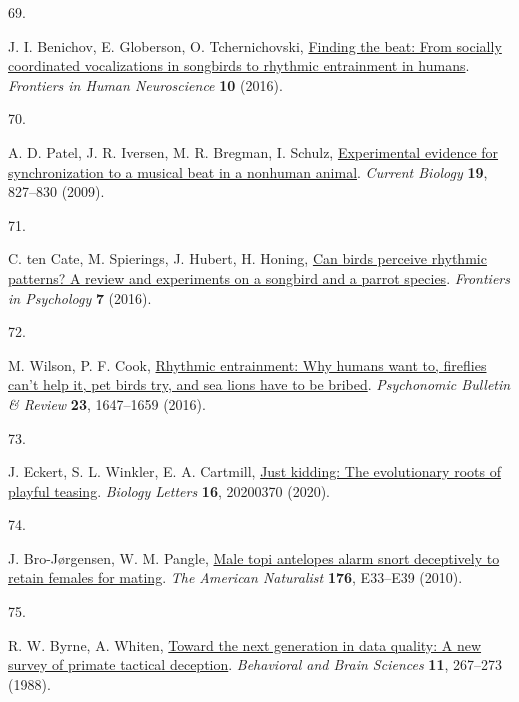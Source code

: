 \documentclass[
  man,floatsintext]{apa6}
\newlength{\cslhangindent}
\newlength{\csllabelwidth}
\newlength{\cslentryspacingunit} %
\newenvironment{CSLReferences}[2] %
 {%
  \setlength{\parindent}{0pt}
  \ifodd #1
  \let\oldpar\par
  \def\par{\hangindent=\cslhangindent\oldpar}
  \fi
  \setlength{\parskip}{#2\cslentryspacingunit}
 }%
 {}
\newcommand{\CSLLeftMargin}[1]{\parbox[t]{\csllabelwidth}{#1}}
\newcommand{\CSLRightInline}[1]{\parbox[t]{\linewidth - \csllabelwidth}{#1}\break}
\begin{document}
\begin{CSLReferences}{0}{0}
\leavevmode{}%
\CSLLeftMargin{69. }%
\CSLRightInline{J. I. Benichov, E. Globerson, O. Tchernichovski, \href{https://doi.org/10.3389/fnhum.2016.00255}{Finding the beat: From socially coordinated vocalizations in songbirds to rhythmic entrainment in humans}. \emph{Frontiers in Human Neuroscience} \textbf{10} (2016).}

\leavevmode{}%
\CSLLeftMargin{70. }%
\CSLRightInline{A. D. Patel, J. R. Iversen, M. R. Bregman, I. Schulz, \href{https://doi.org/10.1016/j.cub.2009.03.038}{Experimental evidence for synchronization to a musical beat in a nonhuman animal}. \emph{Current Biology} \textbf{19}, 827--830 (2009).}

\leavevmode{}%
\CSLLeftMargin{71. }%
\CSLRightInline{C. ten Cate, M. Spierings, J. Hubert, H. Honing, \href{https://doi.org/10.3389/fpsyg.2016.00730}{Can birds perceive rhythmic patterns? A review and experiments on a songbird and a parrot species}. \emph{Frontiers in Psychology} \textbf{7} (2016).}

\leavevmode{}%
\CSLLeftMargin{72. }%
\CSLRightInline{M. Wilson, P. F. Cook, \href{https://doi.org/10.3758/s13423-016-1013-x}{Rhythmic entrainment: Why humans want to, fireflies can't help it, pet birds try, and sea lions have to be bribed}. \emph{Psychonomic Bulletin \& Review} \textbf{23}, 1647--1659 (2016).}

\leavevmode{}%
\CSLLeftMargin{73. }%
\CSLRightInline{J. Eckert, S. L. Winkler, E. A. Cartmill, \href{https://doi.org/10.1098/rsbl.2020.0370}{Just kidding: The evolutionary roots of playful teasing}. \emph{Biology Letters} \textbf{16}, 20200370 (2020).}

\leavevmode{}%
\CSLLeftMargin{74. }%
\CSLRightInline{J. Bro-Jørgensen, W. M. Pangle, \href{https://doi.org/10.1086/653078}{Male topi antelopes alarm snort deceptively to retain females for mating}. \emph{The American Naturalist} \textbf{176}, E33--E39 (2010).}

\leavevmode{}%
\CSLLeftMargin{75. }%
\CSLRightInline{R. W. Byrne, A. Whiten, \href{https://doi.org/10.1017/S0140525X00049955}{Toward the next generation in data quality: A new survey of primate tactical deception}. \emph{Behavioral and Brain Sciences} \textbf{11}, 267--273 (1988).}


\end{CSLReferences}
\end{document}
